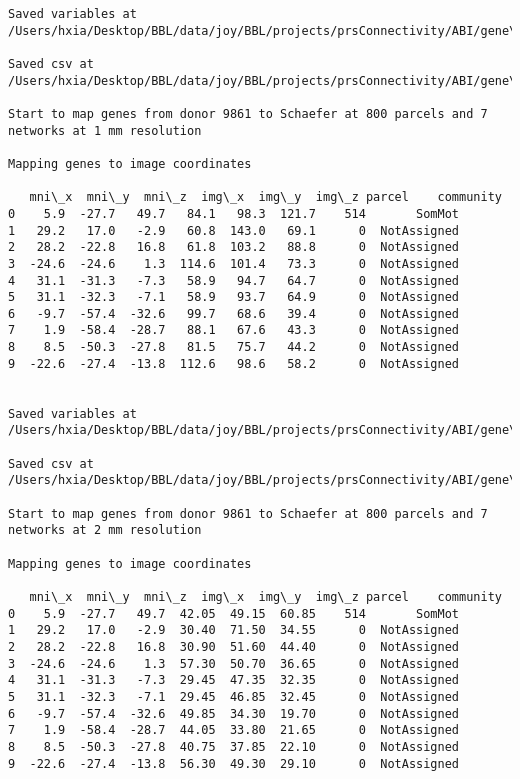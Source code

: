 \documentclass[11pt]{article}
\begin{document}
\begin{Verbatim}[commandchars=\\\{\}]
Saved variables at /Users/hxia/Desktop/BBL/data/joy/BBL/projects/prsConnectivity/ABI/gene\_mapping/9861donor\_600Parcels\_17Network\_2mm.pkl

Saved csv at /Users/hxia/Desktop/BBL/data/joy/BBL/projects/prsConnectivity/ABI/gene\_mapping/9861donor\_600Parcels\_17Network\_2mm.csv

Start to map genes from donor 9861 to Schaefer at 800 parcels and 7 networks at 1 mm resolution

Mapping genes to image coordinates

   mni\_x  mni\_y  mni\_z  img\_x  img\_y  img\_z parcel    community
0    5.9  -27.7   49.7   84.1   98.3  121.7    514       SomMot
1   29.2   17.0   -2.9   60.8  143.0   69.1      0  NotAssigned
2   28.2  -22.8   16.8   61.8  103.2   88.8      0  NotAssigned
3  -24.6  -24.6    1.3  114.6  101.4   73.3      0  NotAssigned
4   31.1  -31.3   -7.3   58.9   94.7   64.7      0  NotAssigned
5   31.1  -32.3   -7.1   58.9   93.7   64.9      0  NotAssigned
6   -9.7  -57.4  -32.6   99.7   68.6   39.4      0  NotAssigned
7    1.9  -58.4  -28.7   88.1   67.6   43.3      0  NotAssigned
8    8.5  -50.3  -27.8   81.5   75.7   44.2      0  NotAssigned
9  -22.6  -27.4  -13.8  112.6   98.6   58.2      0  NotAssigned


Saved variables at /Users/hxia/Desktop/BBL/data/joy/BBL/projects/prsConnectivity/ABI/gene\_mapping/9861donor\_800Parcels\_7Network\_1mm.pkl

Saved csv at /Users/hxia/Desktop/BBL/data/joy/BBL/projects/prsConnectivity/ABI/gene\_mapping/9861donor\_800Parcels\_7Network\_1mm.csv

Start to map genes from donor 9861 to Schaefer at 800 parcels and 7 networks at 2 mm resolution

Mapping genes to image coordinates

   mni\_x  mni\_y  mni\_z  img\_x  img\_y  img\_z parcel    community
0    5.9  -27.7   49.7  42.05  49.15  60.85    514       SomMot
1   29.2   17.0   -2.9  30.40  71.50  34.55      0  NotAssigned
2   28.2  -22.8   16.8  30.90  51.60  44.40      0  NotAssigned
3  -24.6  -24.6    1.3  57.30  50.70  36.65      0  NotAssigned
4   31.1  -31.3   -7.3  29.45  47.35  32.35      0  NotAssigned
5   31.1  -32.3   -7.1  29.45  46.85  32.45      0  NotAssigned
6   -9.7  -57.4  -32.6  49.85  34.30  19.70      0  NotAssigned
7    1.9  -58.4  -28.7  44.05  33.80  21.65      0  NotAssigned
8    8.5  -50.3  -27.8  40.75  37.85  22.10      0  NotAssigned
9  -22.6  -27.4  -13.8  56.30  49.30  29.10      0  NotAssigned



\end{Verbatim}
\end{document}
